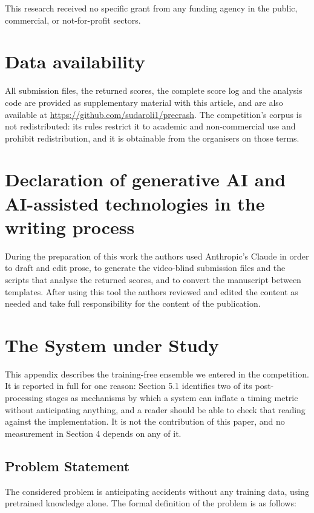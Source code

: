 This research received no specific grant from any funding agency in the public, commercial, or not-for-profit sectors.

\section*{Data availability}

All submission files, the returned scores, the complete score log and the analysis code are provided as supplementary material with this article, and are also available at \url{https://github.com/sudaroli1/precrash}. The competition's corpus is not redistributed: its rules restrict it to academic and non-commercial use and prohibit redistribution, and it is obtainable from the organisers on those terms.

\section*{Declaration of generative AI and AI-assisted technologies in the writing process}

During the preparation of this work the authors used Anthropic's Claude in order to draft and edit prose, to generate the video-blind submission files and the scripts that analyse the returned scores, and to convert the manuscript between templates. After using this tool the authors reviewed and edited the content as needed and take full responsibility for the content of the publication.


\appendix

\section{The System under Study}

This appendix describes the training-free ensemble we entered in the
competition. It is reported in full for one reason: Section 5.1 identifies two
of its post-processing stages as mechanisms by which a system can inflate a
timing metric without anticipating anything, and a reader should be able to
check that reading against the implementation. It is not the contribution of this paper, and no measurement in
Section 4 depends on any of it.

\subsection{Problem Statement}

The considered problem is anticipating accidents without any training data, using pretrained knowledge alone. The formal definition of the problem is as follows:

